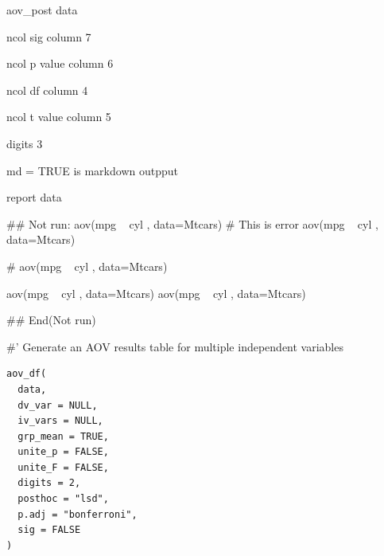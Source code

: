 \documentclass[a4paper]{book}
\begin{document}
\begin{Arguments}
\begin{ldescription}
\item[\code{aov\_post\_data}] aov\_post data

\item[\code{ns}] ncol sig column 7

\item[\code{np}] ncol p value column 6

\item[\code{ndf}] ncol df column 4

\item[\code{nt}] ncol t value column 5

\item[\code{digits}] digits 3

\item[\code{md}] md = TRUE is markdown outpput
\end{ldescription}
\end{Arguments}
%
\begin{Value}
report data
\end{Value}
%
\begin{Examples}
\begin{ExampleCode}
\#\# Not run: 
aov(mpg ~ cyl , data=Mtcars)%
# This is error
aov(mpg ~ cyl , data=Mtcars)%

# aov(mpg ~ cyl , data=Mtcars)%

aov(mpg ~ cyl , data=Mtcars)%
aov(mpg ~ cyl , data=Mtcars)%


## End(Not run)

\end{ExampleCode}
\end{Examples}
%
\begin{Description}
\#' Generate an AOV results table for multiple independent variables
\end{Description}
%
\begin{Usage}
\begin{verbatim}
aov_df(
  data,
  dv_var = NULL,
  iv_vars = NULL,
  grp_mean = TRUE,
  unite_p = FALSE,
  unite_F = FALSE,
  digits = 2,
  posthoc = "lsd",
  p.adj = "bonferroni",
  sig = FALSE
)
\end{verbatim}
\end{Usage}
\end{document}
